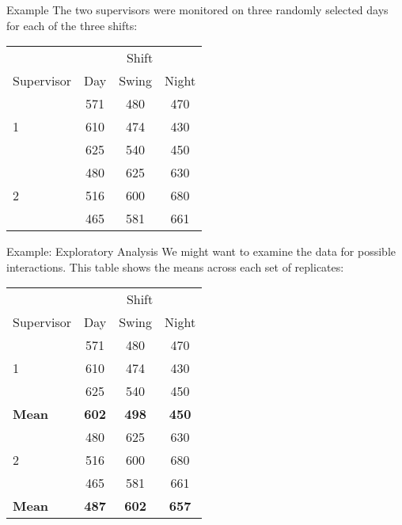 \begin{frame}{Example}
    The two supervisors were monitored on three randomly selected days for each of the three shifts:
    \begin{table}[h]
        \centering
        \begin{tabular}{lccc}
            & \multicolumn{3}{c}{Shift} \\
            \cline{2-4}
            Supervisor & Day & Swing & Night \\
            \hline
            \multirow{3}{*}{1} & 571 & 480 & 470 \\
                            & 610 & 474 & 430 \\
                            & 625 & 540 & 450 \\
            \hline
            \multirow{3}{*}{2} & 480 & 625 & 630 \\
                            & 516 & 600 & 680 \\
                            & 465 & 581 & 661 \\
            \hline
        \end{tabular}
    \end{table}
\end{frame}

\begin{frame}{Example: Exploratory Analysis}
    We might want to examine the data for possible interactions. This table shows the means across each set of replicates:
    \begin{table}[h]
        \centering
        \begin{tabular}{lccc}
            & \multicolumn{3}{c}{Shift} \\
            \cline{2-4}
            Supervisor & Day & Swing & Night \\
            \hline
            \multirow{3}{*}{1} & 571 & 480 & 470 \\
                            & 610 & 474 & 430 \\
                            & 625 & 540 & 450 \\
            \textbf{Mean} & \textbf{602} & \textbf{498} & \textbf{450} \\ 
            \hline
            \multirow{3}{*}{2} & 480 & 625 & 630 \\
                            & 516 & 600 & 680 \\
                            & 465 & 581 & 661 \\
            \textbf{Mean} & \textbf{487} & \textbf{602} & \textbf{657} \\ 
            \hline
        \end{tabular}
    \end{table}
\end{frame}

